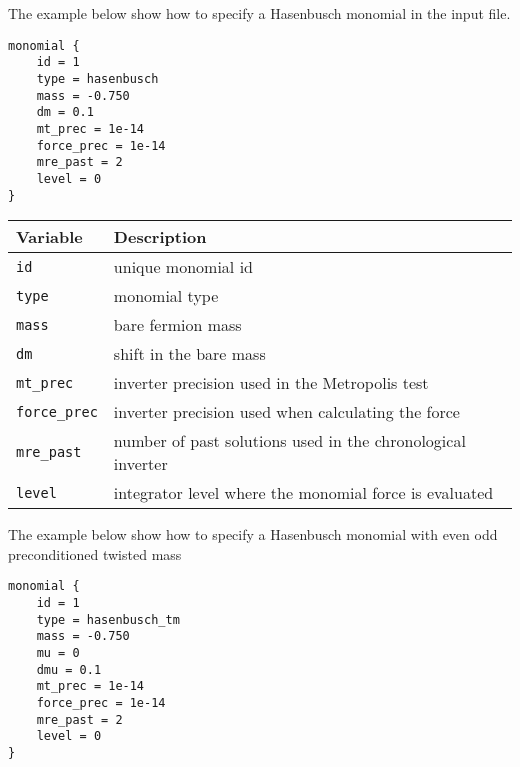 \documentclass[12pt]{article}
\begin{document}
The example below show how to specify a Hasenbusch monomial in the input file.
\begin{center}
\begin{minipage}{55mm}
\begin{framed}
\begin{verbatim}
monomial {
    id = 1
    type = hasenbusch
    mass = -0.750
    dm = 0.1
    mt_prec = 1e-14
    force_prec = 1e-14
    mre_past = 2
    level = 0
}
\end{verbatim}
\vspace{-5mm}
\end{framed}
\end{minipage}
\end{center}

\vspace{2mm}

\begin{center}
\begin{tabular}{l|l}
 Variable & Description \\
 \hline
 \verb|id|         & unique monomial id \\
 \verb|type|       & monomial type \\
 \verb|mass|       & bare fermion mass \\
 \verb|dm|         & shift in the bare mass \\
 \verb|mt_prec|    & inverter precision used in the Metropolis test \\
 \verb|force_prec| & inverter precision used when calculating the force \\
 \verb|mre_past|   & number of past solutions used in the chronological inverter \\
 \verb|level|      & integrator level where the monomial force is evaluated
\end{tabular}
\end{center}


The example below show how to specify a Hasenbusch monomial with
even odd preconditioned twisted mass 
\begin{center}
\begin{minipage}{55mm}
\begin{framed}
\begin{verbatim}
monomial {
    id = 1
    type = hasenbusch_tm
    mass = -0.750
    mu = 0
    dmu = 0.1
    mt_prec = 1e-14
    force_prec = 1e-14
    mre_past = 2
    level = 0
}

\end{verbatim}
\vspace{-5mm}
\end{framed}
\end{minipage}
\end{center}
\end{document}
